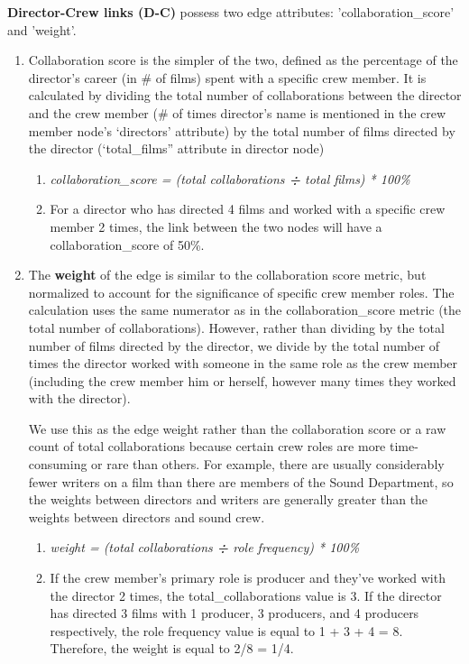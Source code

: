 \documentclass[12pt]{article}
\begin{document}
\textbf{Director-Crew links (D-C)} possess two edge attributes: 'collaboration\_score' and 'weight'. 
\begin{enumerate}
    \item {Collaboration score }is the simpler of the two, defined as the percentage of the director's career (in \# of films) spent with a specific crew member. It is calculated by dividing the total number of collaborations between the director and the crew member (\# of times director's name is mentioned in the crew member node’s ‘directors’ attribute) by the total number of films directed by the director (‘total\_films” attribute in director node)

\begin{enumerate}
    \item \textit{collaboration\_score = (total collaborations \textbf{÷} total films) * 100\%}
    \item For a director who has directed 4 films and worked with a specific crew member 2 times, the link between the two nodes will have a collaboration\_score of 50\%.
\end{enumerate}
  
  \item The \textbf{weight} of the edge is similar to the collaboration score metric, but normalized to account for the significance of specific crew member roles. The calculation uses the same numerator as in the collaboration\_score metric (the total number of collaborations). However, rather than dividing by the total number of films directed by the director, we divide by the total number of times the director worked with someone in the same role as the crew member (including the crew member him or herself, however many times they worked with the director).  

We use this as the edge weight rather than the collaboration score or a raw count of total collaborations because certain crew roles are more time-consuming or rare than others. For example, there are usually considerably fewer writers on a film than there are members of the Sound Department, so the weights between directors and writers are generally greater than the weights between directors and sound crew. 
  \begin{enumerate}
      \item \textit{weight = (total collaborations \textbf{÷} role frequency) * 100\%}
      \item If the crew member's primary role is producer and they've worked with the director 2 times, the total\_collaborations value is 3. If the director has directed 3 films with 1 producer, 3 producers, and 4 producers respectively, the role frequency value is equal to 1 + 3 + 4 = 8. Therefore, the weight is equal to 2/8 = 1/4. 

  \end{enumerate}
    \end{enumerate}
\end{document}
